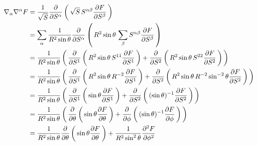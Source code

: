 \documentclass[12pt,a4paper]{report}
\newcommand{\BLUE}[1]{\textcolor{blue}{#1}}
\begin{document}
\BLUE{\begin{align*}
	\nabla_\alpha\nabla^\alpha F &= \frac{1}{\sqrt{S}}\PART{}{S^\alpha}\PAREN{\sqrt{S}\,S^{\alpha\beta}\PART{F}{S^\beta}}\\
	&= \sum_\alpha \frac{1}{R^2\sin\theta}\PART{}{S^\alpha}\PAREN{R^2\sin\theta\,\sum_\beta S^{\alpha\beta}\PART{F}{S^\beta}} \\
	&= \frac{1}{R^2\sin\theta}\PAREN{\PART{}{S^1}\PAREN{R^2\sin\theta\,S^{11}\PART{F}{S^1}}+\PART{}{S^2}\PAREN{R^2\sin\theta\, S^{22}\PART{F}{S^2}}} \\
	&= \frac{1}{R^2\sin\theta}\PAREN{\PART{}{S^1}\PAREN{R^2\sin\theta\,R^{-2}\PART{F}{S^1}}+\PART{}{S^2}\PAREN{R^2\sin\theta\, R^{-2}\sin^{-2}\theta\PART{F}{S^2}}} \\
	&= \frac{1}{R^2\sin\theta}\PAREN{\PART{}{S^1}\PAREN{\sin\theta\PART{F}{S^1}}+\PART{}{S^2}\PAREN{(\sin\theta)^{-1}\PART{F}{S^2}}} \\
	&= \frac{1}{R^2\sin\theta}\PAREN{\PART{}{\theta}\PAREN{\sin\theta\PART{F}{\theta}}+\PART{}{\phi}\PAREN{(\sin\theta)^{-1}\PART{F}{\phi}}} \\
	&= \frac{1}{R^2\sin\theta}\PART{}{\theta}\PAREN{\sin\theta\PART{F}{\theta}}+\frac{1}{R^2\sin^2\theta}\SPART{F}{\phi} \\
\end{align*}
}
\end{document}
